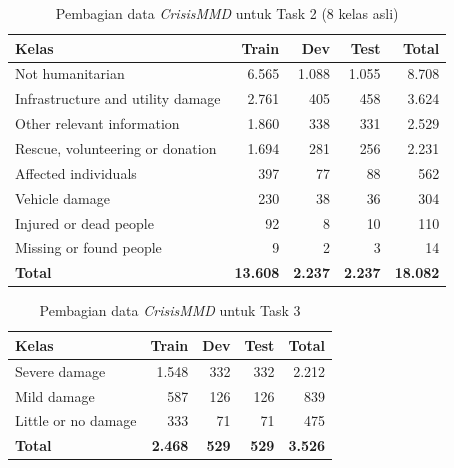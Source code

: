 \begin{table}[h]
    \centering
    \caption{Pembagian data \textit{CrisisMMD} untuk Task 2 (8 kelas
    asli) \cite{alam2018crisismmd}}
    \label{table:crisismmd_task2}
    \begin{tabular}{|l|r|r|r|r|}
        \hline
        \textbf{Kelas} &
        \textbf{Train} &
        \textbf{Dev} &
        \textbf{Test} &
        \textbf{Total} \\
        \hline
        Not humanitarian                  & 6.565 & 1.088 & 1.055 & 8.708 \\
        Infrastructure and utility damage & 2.761 &   405 &   458 & 3.624 \\
        Other relevant information        & 1.860 &   338 &   331 & 2.529 \\
        Rescue, volunteering or donation  & 1.694 &   281 &   256 & 2.231 \\
        Affected individuals              &   397 &    77 &    88 &   562 \\
        Vehicle damage                    &   230 &    38 &    36 &   304 \\
        Injured or dead people            &    92 &     8 &    10 &   110 \\
        Missing or found people           &     9 &     2 &     3 &    14 \\
        \hline
        \textbf{Total}                    & \textbf{13.608} & \textbf{2.237} &
                                            \textbf{2.237}  & \textbf{18.082} \\
        \hline
    \end{tabular}
\end{table}

\begin{table}[h]
    \centering
    \caption{Pembagian data \textit{CrisisMMD} untuk Task 3
    \cite{alam2018crisismmd}}
    \label{table:crisismmd_task3}
    \begin{tabular}{|l|r|r|r|r|}
        \hline
        \textbf{Kelas} &
        \textbf{Train} &
        \textbf{Dev} &
        \textbf{Test} &
        \textbf{Total} \\
        \hline
        Severe damage        & 1.548 & 332 & 332 & 2.212 \\
        Mild damage          &   587 & 126 & 126 &   839 \\
        Little or no damage  &   333 &  71 &  71 &   475 \\
        \hline
        \textbf{Total}       & \textbf{2.468} & \textbf{529} &
                               \textbf{529}   & \textbf{3.526} \\
        \hline
    \end{tabular}
\end{table}
